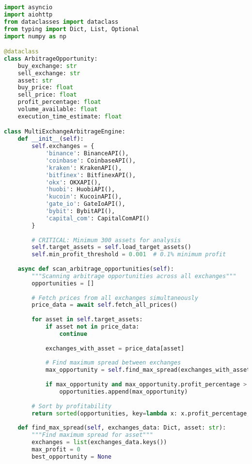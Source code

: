 \documentclass[12pt,a4paper]{article}
\begin{document}
\begin{lstlisting}[language=Python, caption=Multi-Exchange Arbitrage System]
import asyncio
import aiohttp
from dataclasses import dataclass
from typing import Dict, List, Optional
import numpy as np

@dataclass
class ArbitrageOpportunity:
    buy_exchange: str
    sell_exchange: str
    asset: str
    buy_price: float
    sell_price: float
    profit_percentage: float
    volume_available: float
    execution_time_estimate: float

class MultiExchangeArbitrageEngine:
    def __init__(self):
        self.exchanges = {
            'binance': BinanceAPI(),
            'coinbase': CoinbaseAPI(), 
            'kraken': KrakenAPI(),
            'bitfinex': BitfinexAPI(),
            'okx': OKXAPI(),
            'huobi': HuobiAPI(),
            'kucoin': KucoinAPI(),
            'gate_io': GateIoAPI(),
            'bybit': BybitAPI(),
            'capital_com': CapitalComAPI()
        }
        
        # CRITICAL: Minimum 300 assets for analysis
        self.target_assets = self.load_target_assets()
        self.min_profit_threshold = 0.001  # 0.1% minimum profit
        
    async def scan_arbitrage_opportunities(self):
        """Scanning arbitrage opportunities across all exchanges"""
        opportunities = []
        
        # Fetch prices from all exchanges simultaneously
        price_data = await self.fetch_all_prices()
        
        for asset in self.target_assets:
            if asset not in price_data:
                continue
                
            exchanges_with_asset = price_data[asset]
            
            # Find maximum spread between exchanges
            max_opportunity = self.find_max_spread(exchanges_with_asset, asset)
            
            if max_opportunity and max_opportunity.profit_percentage > self.min_profit_threshold:
                opportunities.append(max_opportunity)
        
        # Sort by profitability
        return sorted(opportunities, key=lambda x: x.profit_percentage, reverse=True)
    
    def find_max_spread(self, exchanges_data: Dict, asset: str):
        """Find maximum spread for asset"""
        exchanges = list(exchanges_data.keys())
        max_profit = 0
        best_opportunity = None
        

\end{lstlisting}
\end{document}
